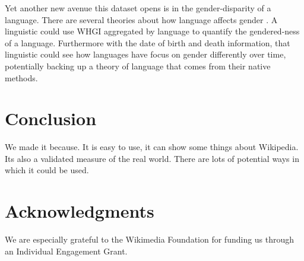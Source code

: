 \documentclass[letterpaper]{article}
\begin{document}
Yet another new avenue this dataset opens is in the gender-disparity of a language. There are several theories about how language affects gender \cite{} \cite{}. A linguistic could use WHGI aggregated by language to quantify the gendered-ness of a language. Furthermore with the date of birth and death information, that linguistic could see how languages have focus on gender differently over time, potentially backing up a theory of language that comes from their native methods. 

\section{Conclusion}
We made it because. It is easy to use, it can show some things about Wikipedia. Its also a validated measure of the real world. There are lots of potential ways in which it could be used.	


\section{ Acknowledgments}
We are especially grateful to the Wikimedia Foundation for funding us through an Individual Engagement Grant.



\end{document}
